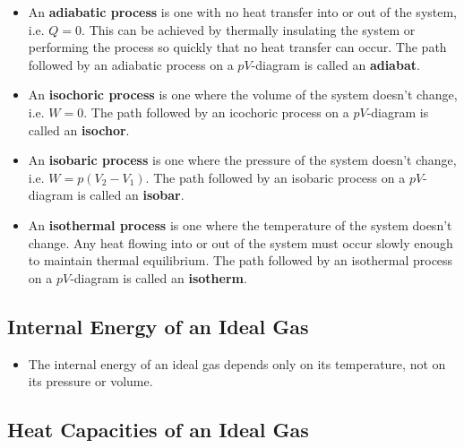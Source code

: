 \documentclass{article}
\begin{document}
\begin{itemize}
  \item An \textbf{adiabatic process} is one with no heat transfer into or out of the system, i.e. $Q = 0$. This can be achieved by thermally insulating the system or performing the process so quickly that no heat transfer can occur. The path followed by an adiabatic process on a $p V$-diagram is called an \textbf{adiabat}.

  \item An \textbf{isochoric process} is one where the volume of the system doesn't change, i.e. $W = 0$. The path followed by an icochoric process on a $p V$-diagram is called an \textbf{isochor}.

  \item An \textbf{isobaric process} is one where the pressure of the system doesn't change, i.e. $W = p (V_2 - V_1)$. The path followed by an isobaric process on a $p V$-diagram is called an \textbf{isobar}.

  \item An \textbf{isothermal process} is one where the temperature of the system doesn't change. Any heat flowing into or out of the system must occur slowly enough to maintain thermal equilibrium. The path followed by an isothermal process on a $p V$-diagram is called an \textbf{isotherm}.
\end{itemize}

\subsection{Internal Energy of an Ideal Gas}

\begin{itemize}
  \item The internal energy of an ideal gas depends only on its temperature, not on its pressure or volume.
\end{itemize}

\subsection{Heat Capacities of an Ideal Gas}
\end{document}
